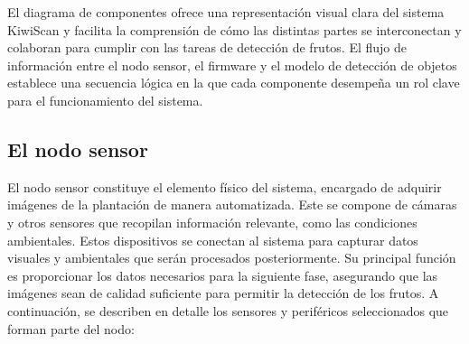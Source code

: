 \vspace{1cm}

El diagrama de componentes ofrece una representación visual clara del sistema KiwiScan y facilita la comprensión de cómo las distintas partes se interconectan y colaboran para cumplir con las tareas de detección de frutos. El flujo de información entre el nodo sensor, el firmware y el modelo de detección de objetos establece una secuencia lógica en la que cada componente desempeña un rol clave para el funcionamiento del sistema.

\subsection{El nodo sensor}

El nodo sensor constituye el elemento físico del sistema, encargado de adquirir imágenes de la plantación de manera automatizada. Este se compone de cámaras y otros sensores que recopilan información relevante, como las condiciones ambientales. Estos dispositivos se conectan al sistema para capturar datos visuales y ambientales que serán procesados posteriormente. Su principal función es proporcionar los datos necesarios para la siguiente fase, asegurando que las imágenes sean de calidad suficiente para permitir la detección de los frutos. A continuación, se describen en detalle los sensores y periféricos seleccionados que forman parte del nodo:

\newpage

